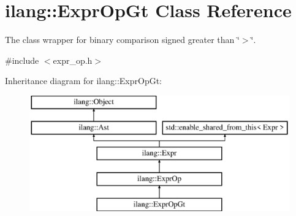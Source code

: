 \hypertarget{classilang_1_1_expr_op_gt}{}\section{ilang\+:\+:Expr\+Op\+Gt Class Reference}
\label{classilang_1_1_expr_op_gt}


The class wrapper for binary comparison signed greater than \char`\"{}$>$\char`\"{}.  




{\ttfamily \#include $<$expr\+\_\+op.\+h$>$}

Inheritance diagram for ilang\+:\+:Expr\+Op\+Gt\+:\begin{figure}[H]
\begin{center}
\leavevmode
\includegraphics[height=5.000000cm]{classilang_1_1_expr_op_gt}
\end{center}
\end{figure}
